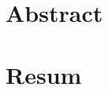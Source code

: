 \chapter*{Abstract}
\begin{comment}
Lorem ipsum dolor sit amet, consectetur adipiscing elit. Pellentesque sed blandit nibh. Suspendisse feugiat vehicula urna, sit amet maximus velit malesuada sit amet. Integer tempus risus maximus neque semper, vitae euismod tortor posuere. Pellentesque rhoncus, augue sit amet porta posuere, tortor turpis auctor lectus, a scelerisque arcu mauris vel leo. Mauris id commodo mi. Ut id magna et dolor ultricies congue. Sed pretium tincidunt rutrum. Vestibulum lacus metus, faucibus eu volutpat eu, cursus sed urna. In laoreet velit a massa varius, at convallis ante efficitur. Fusce eu posuere augue. Vestibulum elementum, tellus ac mattis iaculis, nisi leo posuere enim, eu mollis mi enim eget enim. Proin varius convallis augue, in euismod dui egestas auctor. Curabitur quis varius eros. Donec tortor nulla, fringilla ut pellentesque non, pulvinar non dolor.

Duis ornare commodo nibh eget imperdiet. Donec eu neque eget turpis lacinia gravida. Donec hendrerit, urna convallis dignissim pharetra, odio nibh varius sapien, eu ornare nulla nibh sit amet dolor. Proin commodo ipsum vitae nisi rhoncus, pretium auctor ante euismod. Fusce cursus sapien vel tortor iaculis, a blandit dui volutpat. Sed ut viverra dolor. Duis tempus porta ultrices. Nullam nec purus odio. Interdum et malesuada fames ac ante ipsum primis in faucibus.
\end{comment}

\chapter*{Resum}
\begin{comment}
Lorem ipsum dolor sit amet, consectetur adipiscing elit. Pellentesque sed blandit nibh. Suspendisse feugiat vehicula urna, sit amet maximus velit malesuada sit amet. Integer tempus risus maximus neque semper, vitae euismod tortor posuere. Pellentesque rhoncus, augue sit amet porta posuere, tortor turpis auctor lectus, a scelerisque arcu mauris vel leo. Mauris id commodo mi. Ut id magna et dolor ultricies congue. Sed pretium tincidunt rutrum. Vestibulum lacus metus, faucibus eu volutpat eu, cursus sed urna. In laoreet velit a massa varius, at convallis ante efficitur. Fusce eu posuere augue. Vestibulum elementum, tellus ac mattis iaculis, nisi leo posuere enim, eu mollis mi enim eget enim. Proin varius convallis augue, in euismod dui egestas auctor. Curabitur quis varius eros. Donec tortor nulla, fringilla ut pellentesque non, pulvinar non dolor.

Duis ornare commodo nibh eget imperdiet. Donec eu neque eget turpis lacinia gravida. Donec hendrerit, urna convallis dignissim pharetra, odio nibh varius sapien, eu ornare nulla nibh sit amet dolor. Proin commodo ipsum vitae nisi rhoncus, pretium auctor ante euismod. Fusce cursus sapien vel tortor iaculis, a blandit dui volutpat. Sed ut viverra dolor. Duis tempus porta ultrices. Nullam nec purus odio. Interdum et malesuada fames ac ante ipsum primis in faucibus.
\end{comment}